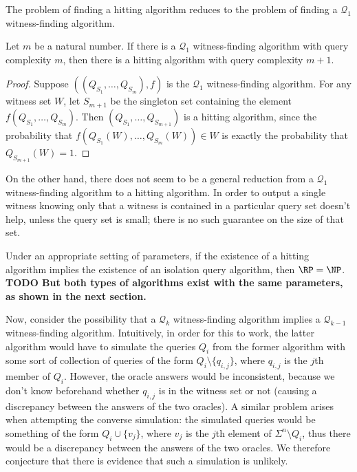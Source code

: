 \documentclass{article}
\newcommand{\todo}[1]{\textbf{TODO #1}}
\newcommand{\mc}{\mathcal}
\begin{document}
The problem of finding a hitting algorithm reduces to the problem of finding a $\mc{Q}_1$ witness-finding algorithm.

\begin{lemma}\label{lem:reduction}
  Let $m$ be a natural number.
  If there is a $\mc{Q}_1$ witness-finding algorithm with query complexity $m$, then there is a hitting algorithm with query complexity $m + 1$.
\end{lemma}
\begin{proof}
  Suppose $((Q_{S_1}, \dotsc, Q_{S_m}), f)$ is the $\mc{Q}_1$ witness-finding algorithm.
  For any witness set $W$, let $S_{m + 1}$ be the singleton set containing the element $f(Q_{S_1}, \dotsc, Q_{S_m})$.
  Then $(Q_{S_1}, \dotsc, Q_{S_{m + 1}})$ is a hitting algorithm, since the probability that $f(Q_{S_1}(W), \dotsc, Q_{S_m}(W)) \in W$ is exactly the probability that $Q_{S_{m + 1}}(W) = 1$.
\end{proof}

On the other hand, there does not seem to be a general reduction from a $\mc{Q}_1$ witness-finding algorithm to a hitting algorithm.
In order to output a single witness knowing only that a witness is contained in a particular query set doesn't help, unless the query set is small; there is no such guarantee on the size of that set.

\begin{conjecture}
  Under an appropriate setting of parameters, if the existence of a hitting algorithm implies the existence of an isolation query algorithm, then $\RP = \NP$.
  \todo{But both types of algorithms exist with the same parameters, as shown in the next section.}
\end{conjecture}

Now, consider the possibility that a $\mc{Q}_k$ witness-finding algorithm implies a $\mc{Q}_{k - 1}$ witness-finding algorithm.
Intuitively, in order for this to work, the latter algorithm would have to simulate the queries $Q_i$ from the former algorithm with some sort of collection of queries of the form $Q_i \setminus \{q_{i, j}\}$, where $q_{i, j}$ is the $j$th member of $Q_i$.
However, the oracle answers would be inconsistent, because we don't know beforehand whether $q_{i, j}$ is in the witness set or not (causing a discrepancy between the answers of the two oracles).
A similar problem arises when attempting the converse simulation: the simulated queries would be something of the form $Q_i \cup \{v_j\}$, where $v_j$ is the $j$th element of $\Sigma^n \setminus Q_i$, thus there would be a discrepancy between the answers of the two oracles.
We therefore conjecture that there is evidence that such a simulation is unlikely.
\end{document}
